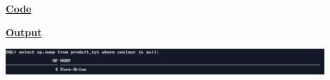 \newpage
{}

\textbf{\underline{Code}}


\vspace{1cm}
\textbf{\underline{Output}}
\vspace{1cm}
\begin{center}
    \includegraphics[width=0.9\textwidth]{Questions/q11/q11.png}
\end{center}


